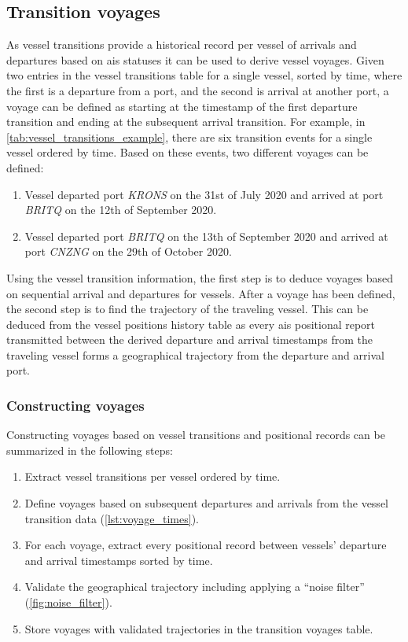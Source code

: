 \subsection{Transition voyages}
\label{sec:transition_voyages}

As vessel transitions provide a historical record per vessel of arrivals and departures based on \acrshort{ais} statuses it can be used to derive vessel voyages. Given two entries in the vessel transitions table for a single vessel, sorted by time, where the first is a departure from a port, and the second is arrival at another port, a voyage can be defined as starting at the timestamp of the first departure transition and ending at the subsequent arrival transition. For example, in \cref{tab:vessel_transitions_example}, there are six transition events for a single vessel ordered by time. Based on these events, two different voyages can be defined:

\begin{enumerate}
    \item  Vessel departed port \textit{KRONS} on the 31st of July 2020 and arrived at port \textit{BRITQ} on the 12th of September 2020.
    \item  Vessel departed port \textit{BRITQ} on the 13th of September 2020 and arrived at port \textit{CNZNG} on the 29th of October 2020.
\end{enumerate}

Using the vessel transition information, the first step is to deduce voyages based on sequential arrival and departures for vessels. After a voyage has been defined, the second step is to find the trajectory of the traveling vessel. This can be deduced from the vessel positions history table as every \acrshort{ais} positional report transmitted between the derived departure and arrival timestamps from the traveling vessel forms a geographical trajectory from the departure and arrival port.

\subsubsection{Constructing voyages}

Constructing voyages based on vessel transitions and positional records can be summarized in the following steps:

\begin{enumerate}
    \item Extract vessel transitions per vessel ordered by time.
    \item Define voyages based on subsequent departures and arrivals from the vessel transition data (\cref{lst:voyage_times}).
    \item For each voyage, extract every positional record between vessels' departure and arrival timestamps sorted by time.
    \item Validate the geographical trajectory including applying a ``noise filter'' (\cref{fig:noise_filter}).
    \item Store voyages with validated trajectories in the transition voyages table.
\end{enumerate}

